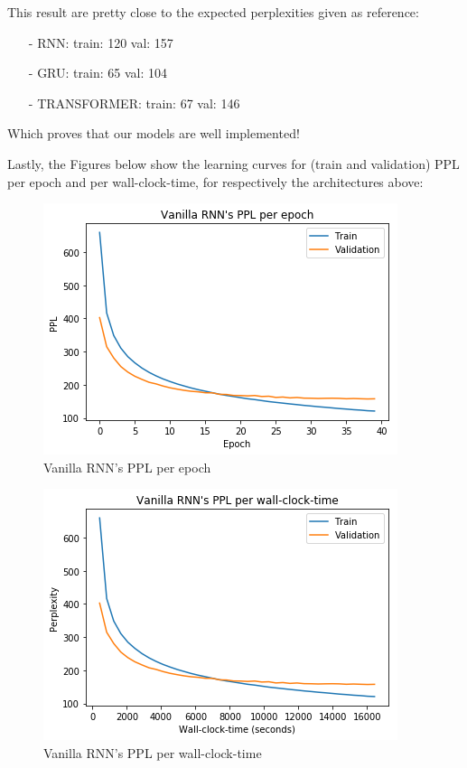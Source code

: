 This result are pretty close to the expected perplexities given as reference:
\begin{itemize}
	\item[-] RNN: train:  120  val: 157
	\item[-] GRU: train:   65  val: 104
	\item[-] TRANSFORMER:  train:  67  val: 146
\end{itemize}

Which proves that our models are well implemented!

Lastly, the Figures below show the learning curves for (train and validation) PPL per epoch and per wall-clock-time, for respectively the architectures above:

\begin{figure}[H]
	\centering
	\includegraphics[scale=0.8]{VRNN_LC_EPOCH.png}
	\caption{Vanilla RNN's PPL per epoch}
	\label{fig:fig1}
\end{figure}

\begin{figure}[H]
	\centering
	\includegraphics[scale=0.8]{VRNN_LC_TIME.png}
	\caption{Vanilla RNN's PPL per wall-clock-time}
	\label{fig:fig2}
\end{figure}

